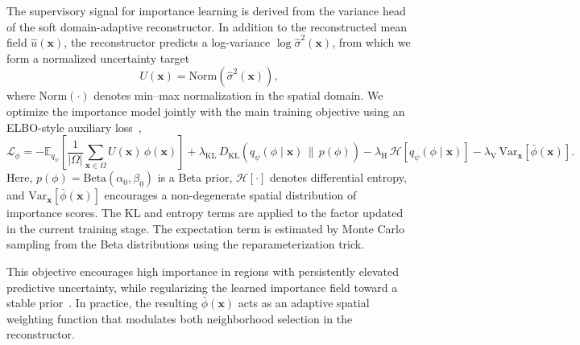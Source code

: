 \documentclass[pdflatex,sn-nature]{sn-jnl}%
\begin{document}
The supervisory signal for importance learning is derived from the variance head of the soft domain-adaptive reconstructor. In addition to the reconstructed mean field \(\hat{u}(\mathbf{x})\), the reconstructor predicts a log-variance \(\log \hat{\sigma}^2(\mathbf{x})\), from which we form a normalized uncertainty target
\begin{equation}
U(\mathbf{x}) = \mathrm{Norm}\!\left(\hat{\sigma}^2(\mathbf{x})\right),
\end{equation}
where \(\mathrm{Norm}(\cdot)\) denotes min--max normalization in the spatial domain. 
We optimize the importance model jointly with the main training objective using an ELBO-style auxiliary loss~\cite{Kingma2014},
\begin{equation}
\mathcal{L}_{\phi}
=
- \mathbb{E}_{q_{\psi}}\!\left[
\frac{1}{|\Omega|}\sum_{\mathbf{x}\in\Omega} U(\mathbf{x})\,\phi(\mathbf{x})
\right]
+ \lambda_{\mathrm{KL}}\,D_{\mathrm{KL}}\!\left(q_{\psi}(\phi \mid \mathbf{x}) \,\|\, p(\phi)\right)
- \lambda_{\mathrm{H}}\,\mathcal{H}\!\left[q_{\psi}(\phi\mid \mathbf{x})\right]
- \lambda_{\mathrm{V}}\,\mathrm{Var}_{\mathbf{x}}\!\left[\bar{\phi}(\mathbf{x})\right].
\end{equation}
Here, \(p(\phi)=\mathrm{Beta}(\alpha_0,\beta_0)\) is a Beta prior, \(\mathcal{H}[\cdot]\) denotes differential entropy, and \(\mathrm{Var}_{\mathbf{x}}[\bar{\phi}(\mathbf{x})]\) encourages a non-degenerate spatial distribution of importance scores. The KL and entropy terms are applied to the factor updated in the current training stage. The expectation term is estimated by Monte Carlo sampling from the Beta distributions using the reparameterization trick.

This objective encourages high importance in regions with persistently elevated predictive uncertainty, while regularizing the learned importance field toward a stable prior~\cite{margossian2024amortized}. 
In practice, the resulting \(\bar{\phi}(\mathbf{x})\) acts as an adaptive spatial weighting function that modulates both neighborhood selection in the reconstructor.
\end{document}
